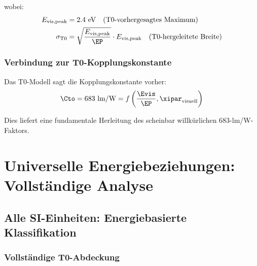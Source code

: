 	wobei:
	\begin{align}
		E_{\text{vis,peak}} &= 2.4 \text{ eV} \quad \text{(T0-vorhergesagtes Maximum)} \\
		\sigma_{\text{T0}} &= \sqrt{\frac{E_{\text{vis,peak}}}{\EP}} \cdot E_{\text{vis,peak}} \quad \text{(T0-hergeleitete Breite)}
	\end{align}
	
	\subsubsection{Verbindung zur T0-Kopplungskonstante}
	\label{subsubsec:t0_kopplungskonstante}
	
	Das T0-Modell sagt die Kopplungskonstante vorher:
	\begin{equation}
		\Cto = 683 \text{ lm/W} = f\left(\frac{\Evis}{\EP}, \xipar_{\text{visuell}}\right)
		\label{eq:t0_kopplungsvorhersage}
	\end{equation}
	
	Dies liefert eine fundamentale Herleitung des scheinbar willkürlichen 683-lm/W-Faktors.
	
	\section{Universelle Energiebeziehungen: Vollständige Analyse}
	\label{sec:universelle_energiebeziehungen}
	
	\subsection{Alle SI-Einheiten: Energiebasierte Klassifikation}
	\label{subsec:alle_si_energiebasiert}
	
	\subsubsection{Vollständige T0-Abdeckung}
	\label{subsubsec:vollstaendige_t0_abdeckung}
	
